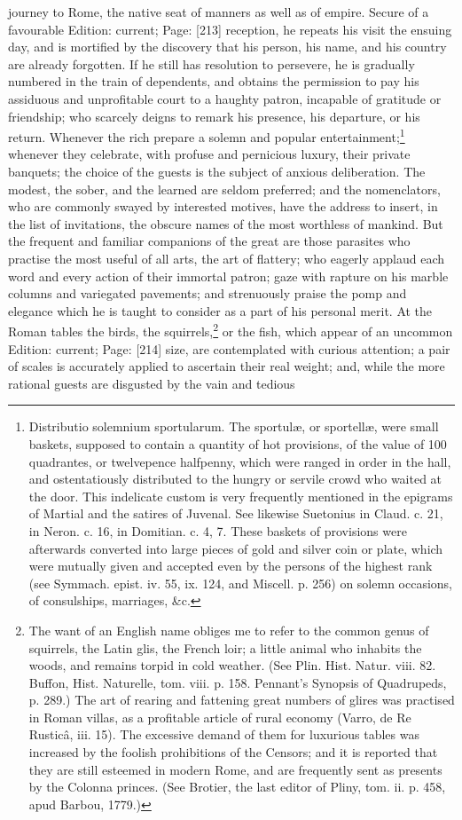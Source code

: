 {journey to Rome, the native seat of manners as well as of empire. Secure of a favourable Edition: current; Page: [213] reception, he repeats his visit the ensuing day, and is mortified by the discovery that his person, his name, and his country are already forgotten. If he still has resolution to persevere, he is gradually numbered in the train of dependents, and obtains the permission to pay his assiduous and unprofitable court to a haughty patron, incapable of gratitude or friendship; who scarcely deigns to remark his presence, his departure, or his return. Whenever the rich prepare a solemn and popular entertainment;\footnote{Distributio solemnium sportularum. The sportulæ, or sportellæ, were small baskets, supposed to contain a quantity of hot provisions, of the value of 100 quadrantes, or twelvepence halfpenny, which were ranged in order in the hall, and ostentatiously distributed to the hungry or servile crowd who waited at the door. This indelicate custom is very frequently mentioned in the epigrams of Martial and the satires of Juvenal. See likewise Suetonius in Claud. c. 21, in Neron. c. 16, in Domitian. c. 4, 7. These baskets of provisions were afterwards converted into large pieces of gold and silver coin or plate, which were mutually given and accepted even by the persons of the highest rank (see Symmach. epist. iv. 55, ix. 124, and Miscell. p. 256) on solemn occasions, of consulships, marriages, \&c.} whenever they celebrate, with profuse and pernicious luxury, their private banquets; the choice of the guests is the subject of anxious deliberation. The modest, the sober, and the learned are seldom preferred; and the nomenclators, who are commonly swayed by interested motives, have the address to insert, in the list of invitations, the obscure names of the most worthless of mankind. But the frequent and familiar companions of the great are those parasites who practise the most useful of all arts, the art of flattery; who eagerly applaud each word and every action of their immortal patron; gaze with rapture on his marble columns and variegated pavements; and strenuously praise the pomp and elegance which he is taught to consider as a part of his personal merit. At the Roman tables the birds, the squirrels,\footnote{The want of an English name obliges me to refer to the common genus of squirrels, the Latin glis, the French loir; a little animal who inhabits the woods, and remains torpid in cold weather. (See Plin. Hist. Natur. viii. 82. Buffon, Hist. Naturelle, tom. viii. p. 158. Pennant\texthebrew{}’s Synopsis of Quadrupeds, p. 289.) The art of rearing and fattening great numbers of glires was practised in Roman villas, as a profitable article of rural economy (Varro, de Re Rusticâ, iii. 15). The excessive demand of them for luxurious tables was increased by the foolish prohibitions of the Censors; and it is reported that they are still esteemed in modern Rome, and are frequently sent as presents by the Colonna princes. (See Brotier, the last editor of Pliny, tom. ii. p. 458, apud Barbou, 1779.)} or the fish, which appear of an uncommon Edition: current; Page: [214] size, are contemplated with curious attention; a pair of scales is accurately applied to ascertain their real weight; and, while the more rational guests are disgusted by the vain and tedious }
